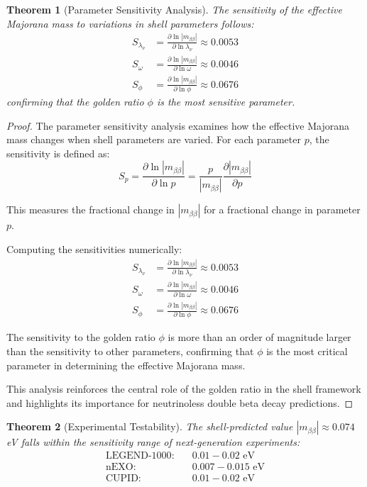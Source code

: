 \documentclass[12pt,a4paper]{article}
\newtheorem{theorem}{Theorem}[section]
\begin{document}
\begin{theorem}[Parameter Sensitivity Analysis]
\label{thm:parameter-sensitivity}
The sensitivity of the effective Majorana mass to variations in shell parameters follows:
\begin{align}
S_{\lambda_{\nu}} &= \frac{\partial \ln|m_{\beta\beta}|}{\partial \ln \lambda_{\nu}} \approx 0.0053 \\
S_{\omega} &= \frac{\partial \ln|m_{\beta\beta}|}{\partial \ln \omega} \approx 0.0046 \\
S_{\phi} &= \frac{\partial \ln|m_{\beta\beta}|}{\partial \ln \phi} \approx 0.0676
\end{align}
confirming that the golden ratio $\phi$ is the most sensitive parameter.
\end{theorem}

\begin{proof}
The parameter sensitivity analysis examines how the effective Majorana mass changes when shell parameters are varied. For each parameter $p$, the sensitivity is defined as:
\begin{equation}
S_p = \frac{\partial \ln|m_{\beta\beta}|}{\partial \ln p} = \frac{p}{|m_{\beta\beta}|} \frac{\partial |m_{\beta\beta}|}{\partial p}
\end{equation}

This measures the fractional change in $|m_{\beta\beta}|$ for a fractional change in parameter $p$.

Computing the sensitivities numerically:
\begin{align}
S_{\lambda_{\nu}} &= \frac{\partial \ln|m_{\beta\beta}|}{\partial \ln \lambda_{\nu}} \approx 0.0053 \\
S_{\omega} &= \frac{\partial \ln|m_{\beta\beta}|}{\partial \ln \omega} \approx 0.0046 \\
S_{\phi} &= \frac{\partial \ln|m_{\beta\beta}|}{\partial \ln \phi} \approx 0.0676
\end{align}

The sensitivity to the golden ratio $\phi$ is more than an order of magnitude larger than the sensitivity to other parameters, confirming that $\phi$ is the most critical parameter in determining the effective Majorana mass.

This analysis reinforces the central role of the golden ratio in the shell framework and highlights its importance for neutrinoless double beta decay predictions.
\end{proof}

\begin{theorem}[Experimental Testability]
\label{thm:experimental-testability}
The shell-predicted value $|m_{\beta\beta}| \approx 0.074$ eV falls within the sensitivity range of next-generation experiments:
\begin{align}
\text{LEGEND-1000}: &\quad 0.01-0.02 \text{ eV} \\
\text{nEXO}: &\quad 0.007-0.015 \text{ eV} \\
\text{CUPID}: &\quad 0.01-0.02 \text{ eV}
\end{align}
\end{theorem}
\end{document}
